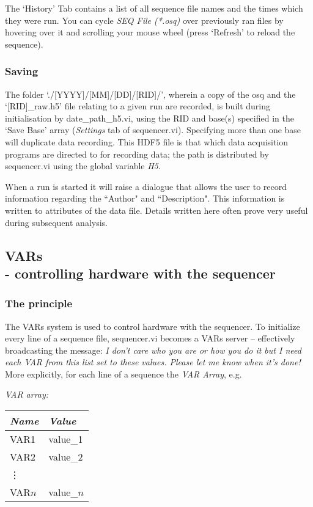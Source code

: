 \documentclass[10pt,a4paper]{article}
\begin{document}
The `History' Tab contains a list of all sequence file names and the times which they were run.  You can cycle \emph{SEQ File (*.osq)} over previously ran files by hovering over it and scrolling your mouse wheel (press `Refresh' to reload the sequence).

\subsubsection{Saving}
The folder `./[YYYY]/[MM]/[DD]/[RID]/', wherein a copy of the osq and the `[RID]\_raw.h5' file relating to a given run are recorded, is built during initialisation by date\_path\_h5.vi, using the RID and base(s) specified in the `Save Base' array (\emph{Settings} tab of sequencer.vi).   Specifying more than one base will duplicate data recording.  This HDF5 file is that which data acquisition programs are directed to for recording data; the path is distributed by sequencer.vi using the global variable \emph{H5}.

When a run is started it will raise a dialogue that allows the user to record information regarding the ``Author" and ``Description".  This information is written to attributes of the data file.  Details written here often prove very useful during subsequent analysis. 

\subsection[VARs]{\label{sex:var}VARs \\ %
	\normalsize - controlling hardware with the sequencer}

\subsubsection{The principle}
The VARs system is used to control hardware with the sequencer.  To initialize every line of a sequence file, sequencer.vi becomes a VARs server -- effectively broadcasting the message: \emph{I don't care who you are or how you do it but I need each VAR from this list set to these values. Please let me know when it's done!}  More explicitly, for each line of a sequence the \emph{VAR Array}, e.g.

\hangindent=0.7cm
\emph{VAR array:} \\
\begin{tabularx}{0.3\textwidth}{X|X}
	\emph{Name} & \emph{Value} \\
	\hline
	VAR1 & value\_1 \\
	VAR2 & value\_2 \\
	\vdots & \\
	VAR$n$ & value\_$n$ \\
\end{tabularx}
\end{document}
